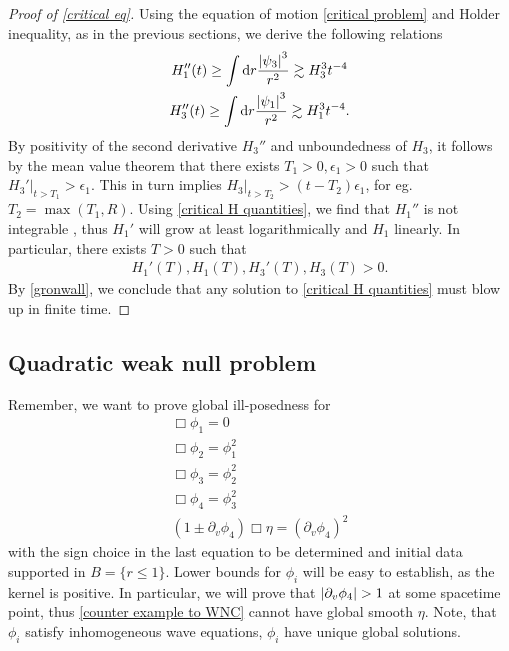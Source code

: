 \documentclass[11pt, oneside]{amsart}
\begin{document}
\begin{proof}[Proof of \cref{critical eq}]
	Using the equation of motion \cref{critical problem} and Holder inequality, as in the previous sections, we derive the following relations
	\begin{equation}\label{critical H quantities}
		\begin{gathered}
			H_1''(t)\geq \int \mathrm{d} r \frac{\left\lvert \psi_3\right\rvert^3}{r^2}\gtrsim H_3^3t^{-4}\\
			H_3''(t)\geq\int\mathrm{d} r \frac{\left\lvert \psi_1\right\rvert^3}{r^2}\gtrsim H_1^3t^{-4}.
		\end{gathered}
	\end{equation}
	By positivity of the second derivative $H_3''$ and unboundedness of $H_3$, it follows by the mean value theorem that there exists $T_1>0,\epsilon_1>0$  such that $H_3'|_{t>T_1}>\epsilon_1$. This in turn implies $H_3|_{t>T_2}>(t-T_2)\epsilon_1$, for eg. $T_2=\max(T_1,R)$. Using \cref{critical H quantities}, we find that $H_1''$ is not integrable , thus $H_1'$ will grow at least logarithmically and $H_1$ linearly. In particular, there exists $T>0$ such that
	\begin{equation*}
		\begin{gathered}
			H_1'(T),H_1(T),H_3'(T),H_3(T)>0.
		\end{gathered}
	\end{equation*}
	By \cref{gronwall}, we conclude that any solution to \cref{critical H quantities} must blow up in finite time.
	\end{proof}


	\subsection{Quadratic weak null problem}
	
	
	Remember, we want to prove global ill-posedness for
	\begin{equation*}
		\begin{gathered}
			\Box\phi_1=0\\
			\Box\phi_2=\phi_1^2\\
			\Box\phi_3=\phi_2^2\\
			\Box\phi_4=\phi_3^2\\
			(1\pm\partial_v\phi_4)\Box\eta=(\partial_v\phi_4)^2
		\end{gathered}
	\end{equation*}
	with the sign choice in the last equation to be determined and initial data supported in $B=\{r\leq1\}$. Lower bounds for $\phi_i$ will be easy to establish, as the kernel is positive. In particular, we will prove that $\left\lvert \partial_v\phi_4\right\rvert>1$ at some spacetime point, thus \cref{counter example to WNC} cannot have global smooth $\eta$. Note, that $\phi_i$ satisfy inhomogeneous wave equations, $\phi_i$ have unique global solutions.
	
\end{document}
